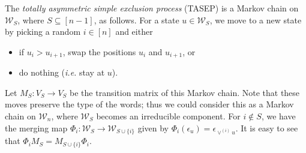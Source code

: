 \documentclass[reqno]{amsart}
\newcommand{\0}{\phantom{c}}
\newcommand{\merge}[1]{\vee_{#1}} %
\newcommand{\mm}{\mathbf{m}}
\newcommand{\mcW}{\mathcal{W}}
\newcommand{\set}[1]{\left\{ #1 \right\}}
\newcommand{\defn}[1]{{\color{darkred}\emph{#1}}} %
\theoremstyle{plain}
\theoremstyle{definition}
\numberwithin{equation}{section}
\begin{document}
The \defn{totally asymmetric simple exclusion process} (TASEP) is a Markov chain on $\mcW_S$, where $S \subseteq[n-1]$, as follows.
For a state $u \in \mcW_S$, we move to a new state by picking a random $i \in [n]$ and either
\begin{itemize}
\item if $u_i > u_{i+1}$, swap the positions $u_i$ and $u_{i+1}$, or
\item do nothing (\textit{i.e.} stay at $u$).
\end{itemize}
Let $M_S \colon V_S \to V_S$ be the transition matrix of this Markov chain.
Note that these moves preserve the type of the words; thus we could consider this as a Markov chain on $\mcW_n$, where $\mcW_S$ becomes an irreducible component.
For $i \notin S$, we have the merging map $\Phi_i \colon \mcW_S \to \mcW_{S\cup\{i\}}$ given by
$\Phi_i(\epsilon_u) = \epsilon_{\vee^{(i)} u}$.
It is easy to see that $\Phi_i M_S = M_{S\cup \{i\}} \Phi_i$. 
\end{document}
